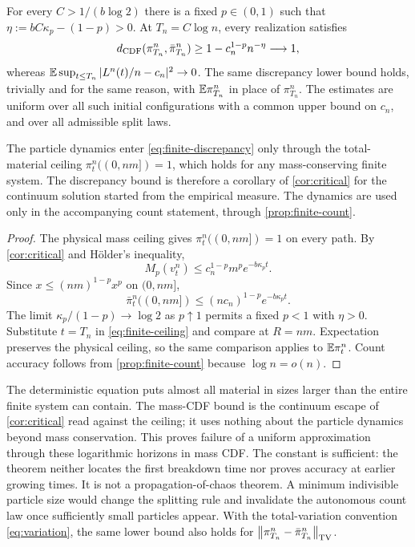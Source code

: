 \begin{theorem}
\label{thm:finite-discrepancy}
For every $C>1/(b\log2)$ there is a fixed $p\in(0,1)$ such that
$\eta:=bC\kappa_p-(1-p)>0$. At $T_n=C\log n$, every realization satisfies
\begin{equation}
 d_{\rm CDF}(\pi_{T_n}^n,\bar\pi_{T_n}^n)
 \geq1-c_n^{1-p}n^{-\eta}\longrightarrow1,
 \label{eq:finite-discrepancy}
\end{equation}
whereas
$\mathbb E\sup_{t\leq T_n}|L^n(t)/n-c_n|^2\to0$.
The same discrepancy lower bound holds, trivially and for the same reason,
with $\mathbb E\pi_{T_n}^n$ in place of $\pi_{T_n}^n$. The estimates are uniform
over all such initial configurations with a common upper bound on $c_n$,
and over all admissible split laws.
\end{theorem}

The particle dynamics enter \eqref{eq:finite-discrepancy} only through the
total-material ceiling $\pi_t^n((0,nm])=1$, which holds for any
mass-conserving finite system. The discrepancy bound is therefore a
corollary of \cref{cor:critical} for the continuum solution started from
the empirical measure. The dynamics are used only in the accompanying count
statement, through \cref{prop:finite-count}.

\begin{proof}
The physical mass ceiling gives $\pi_t^n((0,nm])=1$ on every path.
By \cref{cor:critical} and H\"older's inequality,
\[
 M_p(v_t^n)\leq c_n^{1-p}m^p e^{-b\kappa_p t}.
\]
Since $x\leq(nm)^{1-p}x^p$ on $(0,nm]$,
\begin{equation}
 \bar\pi_t^n((0,nm])
 \leq(nc_n)^{1-p}e^{-b\kappa_p t}.
 \label{eq:finite-ceiling}
\end{equation}
The limit $\kappa_p/(1-p)\to\log2$ as $p\uparrow1$ permits a fixed
$p<1$ with $\eta>0$. Substitute $t=T_n$ in \eqref{eq:finite-ceiling}
and compare at $R=nm$. Expectation preserves the physical ceiling, so the
same comparison applies to $\mathbb E\pi_t^n$. Count accuracy follows from
\cref{prop:finite-count} because $\log n=o(n)$.
\end{proof}

The deterministic equation puts almost all material in sizes larger than
the entire finite system can contain. The mass-CDF bound is the continuum
escape of \cref{cor:critical} read against the ceiling; it uses nothing
about the particle dynamics beyond mass conservation. This proves failure
of a uniform approximation through these logarithmic horizons in mass CDF.
The constant is sufficient: the theorem neither locates the first breakdown
time nor proves accuracy at earlier growing times. It is not a
propagation-of-chaos theorem. A minimum indivisible particle size would
change the splitting rule and invalidate the autonomous count law once
sufficiently small particles appear. With the total-variation convention
\eqref{eq:variation}, the same lower bound also holds for
$\left\lVert \pi_{T_n}^n-\bar\pi_{T_n}^n\right\rVert_{\mathrm{TV}}$.

